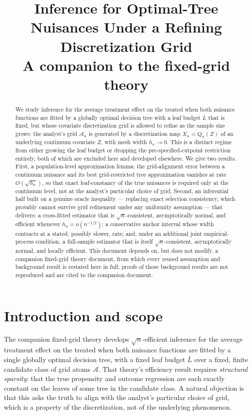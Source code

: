 \documentclass[11pt]{article}
\title{Inference for Optimal-Tree Nuisances Under a Refining
Discretization Grid\\[2pt]
\large A companion to the fixed-grid theory}
\author{}
\date{}
\theoremstyle{plain}
\theoremstyle{definition}
\theoremstyle{remark}
\newcommand{\cA}{\mathcal{A}}
\begin{document}
\maketitle

\begin{abstract}
We study inference for the average treatment effect on the treated when both
nuisance functions are fitted by a globally optimal decision tree with a
leaf budget $\bar L$ that is fixed, but whose covariate discretization grid
is allowed to refine as the sample size grows: the analyst's grid $\cA_n$ is
generated by a discretization map $X_n=Q_n(Z)$ of an underlying continuum
covariate $Z$, with mesh width $h_n\to0$. This is a distinct regime from
either growing the leaf budget or dropping the pre-specified-cutpoint
restriction entirely, both of which are excluded here and developed
elsewhere. We give two results. First, a population-level approximation
lemma: the grid-alignment error between a continuum nuisance and its best
grid-restricted tree approximation vanishes at rate $O(\sqrt{h_n})$, so that
exact leaf-constancy of the true nuisances is required only at the
continuum level, not at the analyst's particular choice of grid. Second, an
inferential half built on a genuine oracle inequality --- replacing exact
selection consistency, which provably cannot survive grid refinement under
any uniformity assumption --- that delivers: a cross-fitted estimator that is
$\sqrt n$-consistent, asymptotically normal, and efficient whenever
$h_n=o(n^{-1/2})$; a conservative anchor interval whose width contracts at a
stated, possibly slower, rate; and, under an additional joint
empirical-process condition, a full-sample estimator that is itself
$\sqrt n$-consistent, asymptotically normal, and locally efficient. This
document depends on, but does not modify, a companion fixed-grid theory
document, from which every reused assumption and background result is
restated here in full; proofs of those background results are not
reproduced and are cited to the companion document.
\end{abstract}

\tableofcontents

\section{Introduction and scope}\label{sec:intro}

The companion fixed-grid theory develops $\sqrt n$-efficient inference for
the average treatment effect on the treated when both nuisance functions are
fitted by a single globally optimal decision tree, with a fixed leaf budget
$\bar L$ over a fixed, finite candidate class of grid atoms $\cA$. That
theory's efficiency result requires \emph{structural sparsity}: that the true
propensity and outcome regression are each exactly constant on the leaves of
some tree in the candidate class. A natural objection is that this asks the
truth to align with the analyst's particular choice of grid, which is a
property of the discretization, not of the underlying phenomenon.
\end{document}
